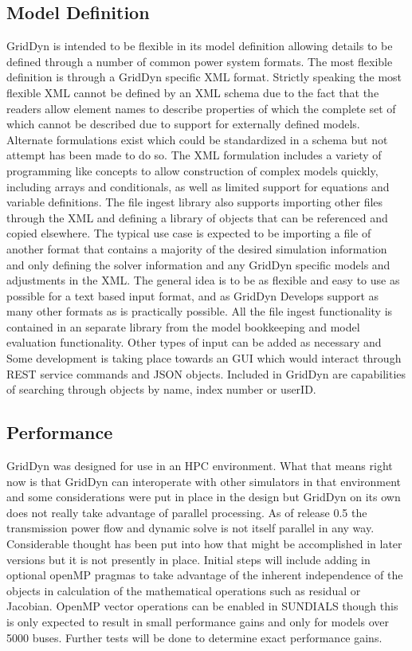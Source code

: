 \documentclass[12pt]{article} %
\begin{document}
\subsection{Model Definition}
GridDyn is intended to be flexible in its model definition allowing details to be defined through a number of common power system formats.  The most flexible definition is through a GridDyn specific XML format.  Strictly speaking the most flexible XML cannot be defined by an XML schema due to the fact that the readers allow element names to describe properties of which the complete set of which cannot be described due to support for externally defined models.  Alternate formulations exist which could be standardized in a schema but not attempt has been made to do so.  The XML formulation includes a variety of programming like concepts to allow construction of complex models quickly, including arrays and conditionals, as well as limited support for equations and variable definitions.  The file ingest library also supports importing other files through the XML and defining a library of objects that can be referenced and copied elsewhere.  The typical use case is expected to be importing a file of another format that contains a majority of the desired simulation information and only defining the solver information and any GridDyn specific models and adjustments in the XML.  The general idea is to be as flexible and easy to use as possible for a text based input format, and as GridDyn Develops support as many other formats as is practically possible.  All the file ingest functionality is contained in an separate library from the model bookkeeping and model evaluation functionality.   Other types of input can be added as necessary and Some development is taking place towards an GUI which would interact through REST service commands and JSON objects.  Included in GridDyn are capabilities of searching through objects by name, index number or userID.

\subsection{Performance}
GridDyn was designed for use in an HPC environment.  What that means right now is that GridDyn can interoperate with other simulators in that environment and some considerations were put in place in the design but GridDyn on its own does not really take advantage of parallel processing.  As of release 0.5 the transmission power flow and dynamic solve is not itself parallel in any way.  Considerable thought has been put into how that might be accomplished in later versions but it is not presently in place.  Initial steps will include adding in optional openMP pragmas to take advantage of the inherent independence of the objects in calculation of the mathematical operations such as residual or Jacobian.  OpenMP vector operations can be enabled in SUNDIALS though this is only expected to result in small performance gains and only for models over 5000 buses.  Further tests will be done to determine exact performance gains.
\end{document}
